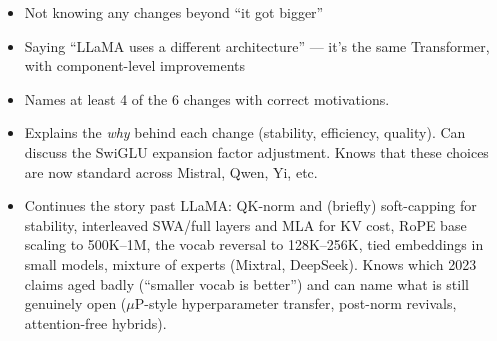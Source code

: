 \begin{interviewq}
\redflags
\begin{itemize}
    \item Not knowing any changes beyond ``it got bigger''
    \item Saying ``LLaMA uses a different architecture'' --- it's the same Transformer, with component-level improvements
\end{itemize}


\goodgreat
\begin{itemize}
    \item {} Names at least 4 of the 6 changes with correct motivations.
    \item {} Explains the \textit{why} behind each change (stability, efficiency, quality). Can discuss the SwiGLU expansion factor adjustment. Knows that these choices are now standard across Mistral, Qwen, Yi, etc.
    \item {} Continues the story past LLaMA: QK-norm and (briefly) soft-capping for stability, interleaved SWA/full layers and MLA for KV cost, RoPE base scaling to 500K--1M, the vocab reversal to 128K--256K, tied embeddings in small models, mixture of experts (Mixtral, DeepSeek). Knows which 2023 claims aged badly (``smaller vocab is better'') and can name what is still genuinely open ($\mu$P-style hyperparameter transfer, post-norm revivals, attention-free hybrids).
\end{itemize}

\end{interviewq}

